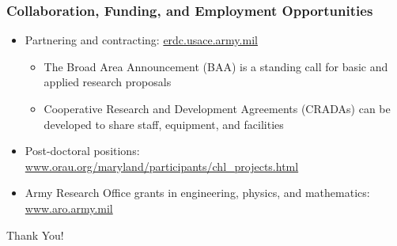 \documentclass{beamer}
\begin{document}
\begin{frame}
  \frametitle{Collaboration, Funding, and Employment Opportunities}
  \begin{itemize}
  \item Partnering and contracting: {\footnotesize
    \url{erdc.usace.army.mil}}
\begin{itemize}
  \item The Broad Area Announcement (BAA) is a standing call for basic
    and applied research proposals
  \item Cooperative Research and Development Agreements (CRADAs) can
    be developed to share staff, equipment, and facilities
\end{itemize}
  \item Post-doctoral positions:\\ {\footnotesize
    \url{www.orau.org/maryland/participants/chl\_projects.html}}
  \item Army Research Office grants in engineering, physics, and
    mathematics:\\ {\footnotesize \url{www.aro.army.mil}}
  \end{itemize}
\begin{center} \large \alert{Thank You!} \end{center}
\end{frame}
\end{document}
